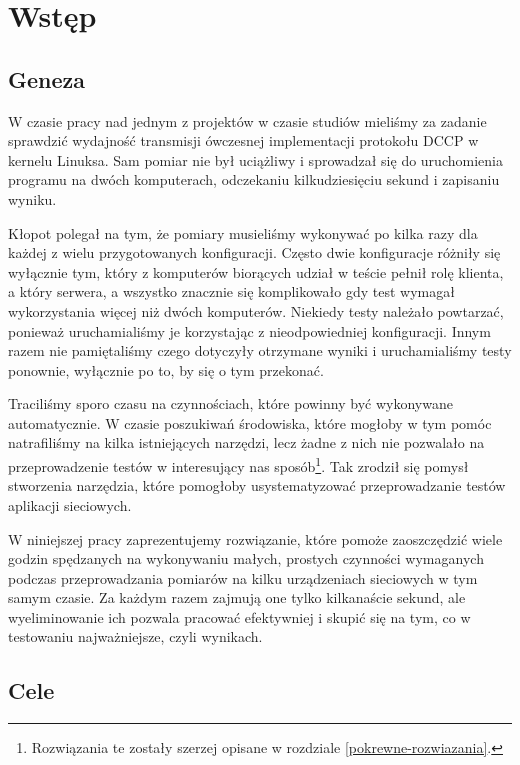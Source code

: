 \documentclass[00-praca-magisterska.tex]{subfiles}
\begin{document}
\chapter{Wstęp}
\label{wstep}

\section{Geneza}
\label{geneza}

W czasie pracy nad jednym z projektów w czasie studiów mieliśmy za zadanie
sprawdzić wydajność transmisji ówczesnej implementacji protokołu DCCP w kernelu
Linuksa.  Sam pomiar nie był uciążliwy i sprowadzał się do uruchomienia
programu na dwóch komputerach, odczekaniu kilkudziesięciu sekund i zapisaniu
wyniku.

Kłopot polegał na tym, że pomiary musieliśmy wykonywać po kilka razy dla
każdej z wielu przygotowanych konfiguracji. Często dwie konfiguracje różniły się
wyłącznie tym, który z komputerów biorących udział w teście pełnił rolę klienta,
a który serwera, a wszystko znacznie się komplikowało gdy test wymagał
wykorzystania więcej niż dwóch komputerów. Niekiedy testy należało powtarzać,
ponieważ uruchamialiśmy je korzystając z nieodpowiedniej konfiguracji. Innym
razem nie pamiętaliśmy czego dotyczyły otrzymane wyniki i uruchamialiśmy testy
ponownie, wyłącznie po to, by się o tym przekonać.

Traciliśmy sporo czasu na czynnościach, które powinny być wykonywane
automatycznie. W czasie poszukiwań środowiska, które mogłoby w tym pomóc
natrafiliśmy na kilka istniejących narzędzi, lecz żadne z nich nie pozwalało
na przeprowadzenie testów w interesujący nas sposób\footnote{Rozwiązania te zostały
szerzej opisane w rozdziale \ref{pokrewne-rozwiazania}.}. Tak
zrodził się pomysł stworzenia narzędzia, które pomogłoby usystematyzować
przeprowadzanie testów aplikacji sieciowych.

W niniejszej pracy zaprezentujemy rozwiązanie, które pomoże zaoszczędzić wiele
godzin spędzanych na wykonywaniu małych, prostych czynności wymaganych podczas
przeprowadzania pomiarów na kilku urządzeniach sieciowych w tym samym czasie.
Za każdym razem zajmują one tylko kilkanaście sekund, ale wyeliminowanie ich
pozwala pracować efektywniej i skupić się na tym, co w testowaniu
najważniejsze, czyli wynikach.

\section{Cele}
\label{cele}
\end{document}
